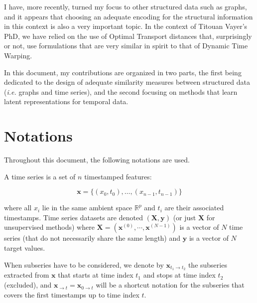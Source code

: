 I have, more recently, turned my focus to other structured data such as graphs,
and it appears that choosing an adequate encoding for the structural information
in this context is also a very important topic.
In the context of Titouan Vayer's PhD, we have relied on the use of Optimal
Transport distances that, surprisingly
or not, use formulations that are very similar in spirit to that of
Dynamic Time Warping.

In this document, my contributions are organized in two
parts, the first being dedicated to the design of adequate similarity
measures between structured data (\emph{i.e.} graphs and time series), and the
second focusing on methods that
learn latent representations for temporal data.

\section*{Notations}

Throughout this document, the following notations are used.

A time series is a set of $n$ timestamped features:

\begin{equation}
    \mathbf{x} = \{ (x_0, t_0), \dots , (x_{n-1}, t_{n-1}) \}
\end{equation}

where all $x_i$ lie in the same ambient space $\mathbb{R}^{p}$ and $t_i$ are
their associated timestamps.
Time series datasets are denoted $(\mathbf{X}, \mathbf{y})$ (or just
$\mathbf{X}$ for unsupervised methods) where
$\mathbf{X} = \left( \mathbf{x}^{(0)}, \cdots, \mathbf{x}^{(N-1)} \right)$ is
a vector of $N$ time series (that do not necessarily share the same length) and
$\mathbf{y}$ is a vector of $N$ target values.

When subseries have to be considered, we denote by
$\mathbf{x}_{t_1 \rightarrow t_2}$ the subseries extracted from $\mathbf{x}$
that starts at time index $t_1$ and stops at time index $t_2$ (excluded), and
$\mathbf{x}_{\rightarrow t} = \mathbf{x}_{0 \rightarrow t}$ will be a shortcut
notation for the subseries that covers the first timestamps up to time index
$t$.
